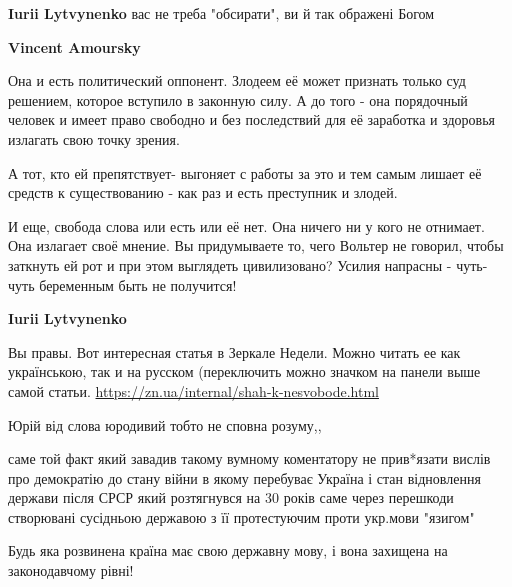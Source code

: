 \begin{itemize}
\begin{itemize}

\textbf{Iurii Lytvynenko} вас не треба "обсирати", ви й так ображені Богом


\textbf{Vincent Amoursky} 

Она и есть политический оппонент. Злодеем её может признать только суд
решением, которое вступило в законную силу. А до того - она порядочный человек
и имеет право свободно и без последствий для её заработка и здоровья излагать
свою точку зрения. 

А тот, кто ей препятствует- выгоняет с работы за это и тем самым лишает её
средств к существованию - как раз и есть преступник и злодей. 

И еще, свобода слова или есть или её нет. Она ничего ни у кого не отнимает. Она
излагает своё мнение. Вы придумываете то, чего Вольтер не говорил, чтобы
заткнуть ей рот и при этом выглядеть цивилизовано? Усилия напрасны - чуть-чуть
беременным быть не получится!


\textbf{Iurii Lytvynenko} 

Вы правы. Вот интересная статья в Зеркале Недели. Можно читать ее как
українською, так и на русском (переключить можно значком на панели выше самой
статьи. \url{https://zn.ua/internal/shah-k-nesvobode.html}



Юрій від слова юродивий тобто не сповна розуму,,

саме той факт який завадив такому вумному коментатору не прив*язати вислів про
демократію до стану війни в якому перебуває Україна і стан відновлення держави
після СРСР який розтягнувся на 30 років саме через перешкоди створювані
сусідньою державою з її протестуючим проти укр.мови "язигом"

\end{itemize}


Будь яка розвинена країна має свою державну мову, і вона захищена на
законодавчому рівні!


\end{itemize}
